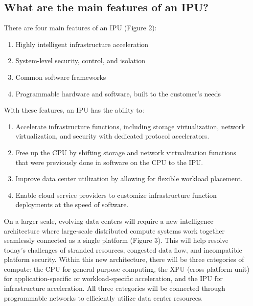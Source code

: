 \documentclass[../sn.tex]{subfiles}
\begin{document}
\subsection{What are the main features of an IPU?}
There are four main features of an IPU (Figure 2): 
\begin{enumerate}
    \item Highly intelligent infrastructure acceleration 
    \item System-level security, control, and isolation
    \item Common software frameworks 
    \item Programmable hardware and software, built to the customer's needs
\end{enumerate} With these features, an IPU has the ability to:
\begin{enumerate}
    \item Accelerate infrastructure functions, including storage virtualization, network 
    virtualization, and security with dedicated protocol accelerators.
    \item Free up the CPU by shifting storage and network virtualization functions that
    were previously done in software on the CPU to the IPU. 
    \item Improve data center utilization by allowing for flexible workload placement.
    \item Enable cloud service providers to customize infrastructure function deployments 
    at the speed of software. 
\end{enumerate} 
On a larger scale, evolving data centers will require a new intelligence architecture 
where large-scale distributed compute systems work together seamlessly connected as a single platform (Figure 3).
This will help resolve today's challenges of stranded resources, congested data flow, and 
incompatible platform security. Within this new architecture, there will be three categories of compute: 
the CPU for general purpose computing, the XPU (cross-platform unit) for application-specific or workload-specific 
acceleration, and the IPU for infrastructure acceleration. All three categories will be connected through 
programmable networks to efficiently utilize data center resources.
\end{document}
